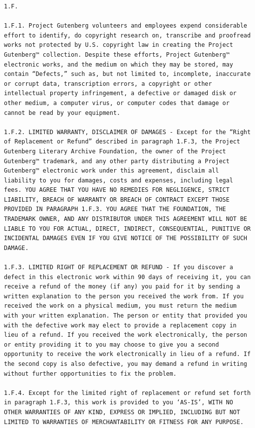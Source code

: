\documentclass{article}
\begin{document}
\begin{verbatim}
1.F.

1.F.1. Project Gutenberg volunteers and employees expend considerable
effort to identify, do copyright research on, transcribe and proofread
works not protected by U.S. copyright law in creating the Project
Gutenberg™ collection. Despite these efforts, Project Gutenberg™
electronic works, and the medium on which they may be stored, may
contain “Defects,” such as, but not limited to, incomplete, inaccurate
or corrupt data, transcription errors, a copyright or other
intellectual property infringement, a defective or damaged disk or
other medium, a computer virus, or computer codes that damage or
cannot be read by your equipment.

1.F.2. LIMITED WARRANTY, DISCLAIMER OF DAMAGES - Except for the “Right
of Replacement or Refund” described in paragraph 1.F.3, the Project
Gutenberg Literary Archive Foundation, the owner of the Project
Gutenberg™ trademark, and any other party distributing a Project
Gutenberg™ electronic work under this agreement, disclaim all
liability to you for damages, costs and expenses, including legal
fees. YOU AGREE THAT YOU HAVE NO REMEDIES FOR NEGLIGENCE, STRICT
LIABILITY, BREACH OF WARRANTY OR BREACH OF CONTRACT EXCEPT THOSE
PROVIDED IN PARAGRAPH 1.F.3. YOU AGREE THAT THE FOUNDATION, THE
TRADEMARK OWNER, AND ANY DISTRIBUTOR UNDER THIS AGREEMENT WILL NOT BE
LIABLE TO YOU FOR ACTUAL, DIRECT, INDIRECT, CONSEQUENTIAL, PUNITIVE OR
INCIDENTAL DAMAGES EVEN IF YOU GIVE NOTICE OF THE POSSIBILITY OF SUCH
DAMAGE.

1.F.3. LIMITED RIGHT OF REPLACEMENT OR REFUND - If you discover a
defect in this electronic work within 90 days of receiving it, you can
receive a refund of the money (if any) you paid for it by sending a
written explanation to the person you received the work from. If you
received the work on a physical medium, you must return the medium
with your written explanation. The person or entity that provided you
with the defective work may elect to provide a replacement copy in
lieu of a refund. If you received the work electronically, the person
or entity providing it to you may choose to give you a second
opportunity to receive the work electronically in lieu of a refund. If
the second copy is also defective, you may demand a refund in writing
without further opportunities to fix the problem.

1.F.4. Except for the limited right of replacement or refund set forth
in paragraph 1.F.3, this work is provided to you ‘AS-IS’, WITH NO
OTHER WARRANTIES OF ANY KIND, EXPRESS OR IMPLIED, INCLUDING BUT NOT
LIMITED TO WARRANTIES OF MERCHANTABILITY OR FITNESS FOR ANY PURPOSE.


\end{verbatim}
\end{document}
